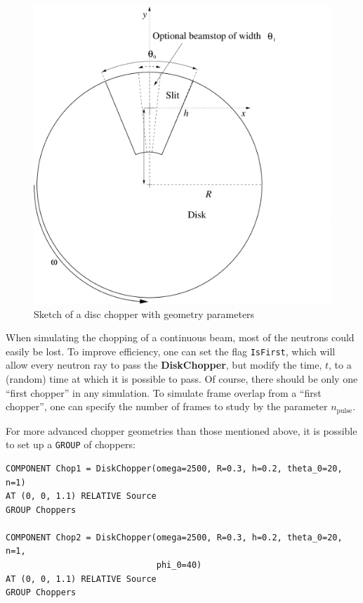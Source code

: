 \begin{figure}[ht]
\centering
\includegraphics[width=0.8\linewidth]{figures/DiskChopper}
\caption{Sketch of a disc chopper with geometry parameters}
\label{f:chopper1}
\end{figure}


%

When simulating the chopping of a continuous beam,
most of the neutrons could easily be lost.
To improve efficiency, one can set the flag \verb+IsFirst+, which will
allow every neutron ray to pass the \textbf{DiskChopper}, but modify the
time, $t$, to a (random) time at which it is possible to pass.
Of course, there should be only one ``first chopper'' in
any simulation.
To simulate frame overlap from a ``first chopper'', one can specify
the number of frames to study by the parameter $n_\textrm{pulse}$.

For more advanced chopper geometries than those mentioned above, it is
possible to set up a \texttt{GROUP} of choppers:

\begin{lstlisting}
COMPONENT Chop1 = DiskChopper(omega=2500, R=0.3, h=0.2, theta_0=20, n=1)
AT (0, 0, 1.1) RELATIVE Source
GROUP Choppers

COMPONENT Chop2 = DiskChopper(omega=2500, R=0.3, h=0.2, theta_0=20, n=1,
                              phi_0=40)
AT (0, 0, 1.1) RELATIVE Source
GROUP Choppers
\end{lstlisting}

